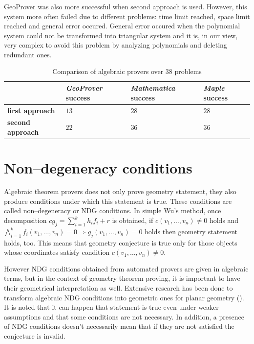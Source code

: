 \documentclass[final,1p,times,authoryear]{elsarticle}
\begin{document}
GeoProver was also more successful when second approach is
used. However, this system more often failed due to different
problems: time limit reached, space limit reached and general error
occured. General error occured when the polynomial system could not be
transformed into triangular system and it is, in our view, very
complex to avoid this problem by analyzing polynomials and deleting
redundant ones.

\begin{table}[!hb]
\begin{center}
\begin{tabular}{L{2cm}||R{2cm}|R{2cm}|R{2cm}}
\                      & \emph{GeoProver}  success & \emph{Mathematica} success & \emph{Maple} success \\
\hline
\hline
\textbf{first approach}  &  $13$  & $28$ & $28$  \\
\hline
\textbf{second approach} &  $22$  & $36$ & $36$ \\
\end{tabular}
\caption{Comparison of algebraic provers over $38$ problems}
\end{center}
\end{table}


\section{Non--degeneracy conditions}


Algebraic theorem provers does not only prove geometry statement, they
also produce conditions under which this statement is true. These
conditions are called non--degeneracy or NDG conditions. In simple
Wu's method, once decomposition $cg_j = \sum_{i=1}^{k}h_if_i + r$ is
obtained, if $c(v_1, \ldots, v_n) \neq 0$ holds and $\bigwedge_{i =
  1}^{k} f_i(v_1, \ldots, v_n) = 0 \Longrightarrow g_j(v_1, \ldots,
v_n) = 0$ holds then geometry statement holds, too. This means that
geometry conjecture is true only for those objects whose coordinates
satisfy condition $c(v_1, \ldots, v_n) \neq 0$.  

However NDG conditions obtained from automated provers are given in
algebraic terms, but in the context of geometry theorem proving, it is
important to have their geometrical interpretation as well. Extensive
research has been done to transform algebraic NDG conditions into
geometric ones for planar geometry (\cite{chou1988mechanical}). It is
noted that it can happen that statement is true even under weaker
assumptions and that some conditions are not necessary. In addition, a
presence of NDG conditions doesn't necessarily mean that if they are
not satisfied the conjecture is invalid.
\end{document}
